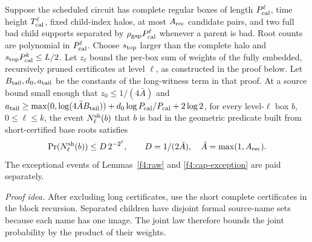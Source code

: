 \begin{lemma}\label{f4:recursion}
Suppose the scheduled circuit has complete regular boxes of length
\(P_{\rm cal}^\ell\), time height \(T_{\rm cal}^\ell\), fixed child-index halos, at most
\(A_{\rm rec}\) candidate pairs, and two full bad child supports
separated by \(\rho_{\rm gap}P_{\rm cal}^\ell\) whenever a parent is bad.
Root counts are polynomial in \(P_{\rm cal}^\ell\). Choose \(s_{\rm top}\)
larger than the complete halo and \(s_{\rm top}P_{\rm cal}^k\le L/2\).
Let \(z_\ell\) bound the per-box sum of weights of the fully embedded,
recursively pruned certificates at level \(\ell\), as constructed in
the proof below. Let \(B_{\rm tail},d_0,a_{\rm tail}\) be the constants
of the long-witness term in that proof. At a source bound small enough
that \(z_0\le1/(4\bar A)\) and
\(a_{\rm tail}\ge\max(0,\log(4\bar AB_{\rm tail}))
+d_0\log P_{\rm cal}/P_{\rm cal}+2\log2\),
for every level-\(\ell\) box \(b\), \(0\le\ell\le k\), the event
\(N^{\rm sh}_\ell(b)\) that \(b\) is bad in the geometric predicate built
from short-certified base roots satisfies
\[
 \Pr(N^{\rm sh}_\ell(b))\le D\,2^{-2^\ell},\qquad
 D=1/(2\bar A),\quad \bar A=\max(1,A_{\rm rec}).
\]
The exceptional events of Lemmas~\ref{f4:raw} and
\ref{f4:cap-exception} are paid separately.
\end{lemma}
\par\noindent\emph{Proof idea.} After excluding long certificates, use the short complete certificates in the block recursion. Separated children have disjoint formal source-name sets because each name has one image. The joint law therefore bounds the joint probability by the product of their weights.

